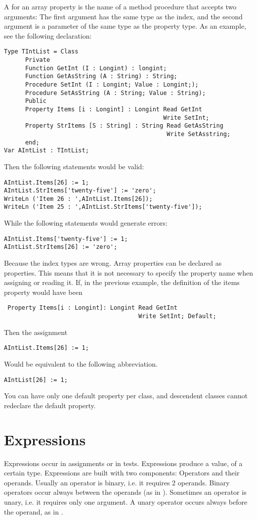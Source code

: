 \documentclass{report}
\begin{document}
A  for an array property is the name of a method
procedure that accepts two arguments: The first argument has the same
type as the index, and the second argument is a parameter of the same
type as the property type.
As an example, see the following declaration:
\begin{verbatim}
Type TIntList = Class
      Private
      Function GetInt (I : Longint) : longint;
      Function GetAsString (A : String) : String;
      Procedure SetInt (I : Longint; Value : Longint;);
      Procedure SetAsString (A : String; Value : String);
      Public
      Property Items [i : Longint] : Longint Read GetInt
                                             Write SetInt;
      Property StrItems [S : String] : String Read GetAsString
                                              Write SetAsstring;
      end;
Var AIntList : TIntList;
\end{verbatim}
Then the following statements would be valid:
\begin{verbatim}
AIntList.Items[26] := 1;
AIntList.StrItems['twenty-five'] := 'zero';
WriteLn ('Item 26 : ',AIntList.Items[26]);
WriteLn ('Item 25 : ',AIntList.StrItems['twenty-five']);
\end{verbatim}
While the following statements would generate errors:
\begin{verbatim}
AIntList.Items['twenty-five'] := 1;
AIntList.StrItems[26] := 'zero';
\end{verbatim}
Because the index types are wrong.
Array properties can be declared as  properties. This means that
it is not necessary to specify the property name when assigning or reading
it. If, in the previous example, the definition of the items property would
have been
\begin{verbatim}
 Property Items[i : Longint]: Longint Read GetInt
                                      Write SetInt; Default;
\end{verbatim}
Then the assignment
\begin{verbatim}
AIntList.Items[26] := 1;
\end{verbatim}
Would be equivalent to the following abbreviation.
\begin{verbatim}
AIntList[26] := 1;
\end{verbatim}
You can have only one default property per class, and descendent classes
cannot redeclare the default property.
\chapter{Expressions}
\label{ch:Expressions}
Expressions occur in assignments or in tests. Expressions produce a value,
of a certain type.
Expressions are built with two components: Operators and their operands.
Usually an operator is binary, i.e. it requires 2 operands. Binary operators
occur always between the operands (as in ). Sometimes an
operator is unary, i.e. it requires only one argument. A unary operator
occurs always before the operand, as in .
\end{document}
